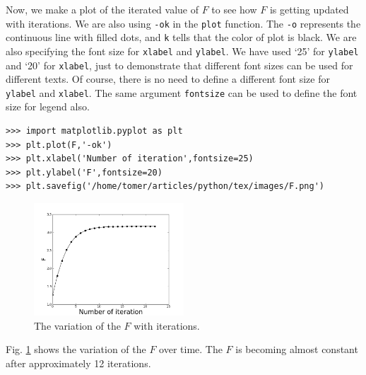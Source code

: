 \documentclass[10pt]{book}
\begin{document}
{Now, we make a plot of the iterated value of $F$ to see how $F$ is getting updated with iterations. We are also using \verb"-ok" in the \verb"plot" function. The \verb"-o" represents the continuous line with filled dots, and \verb"k" tells that the color of plot is black. We are also specifying the font size for \verb"xlabel" and \verb"ylabel". We have used `25' for \verb"ylabel" and `20' for \verb"xlabel", just to demonstrate that different font sizes can be used for different texts. Of course, there is no need to define a different font size for \verb"ylabel" and \verb"xlabel". The same argument \verb"fontsize" can be used to define the font size for legend also. 

\beforeverb \begin{verbatim}
>>> import matplotlib.pyplot as plt
>>> plt.plot(F,'-ok')
>>> plt.xlabel('Number of iteration',fontsize=25)
>>> plt.ylabel('F',fontsize=20)
>>> plt.savefig('/home/tomer/articles/python/tex/images/F.png')
\end{verbatim} \afterverb

\beforefig
\begin{figure}[h!]
  \centering
    \includegraphics[width=0.5\textwidth]{images/F.png}
  \caption{The variation of the $F$ with iterations.}
   \label{fig:F}
\end{figure}
\afterfig

Fig. \ref{fig:F} shows the variation of the $F$ over time. The $F$ is becoming almost constant after approximately 12 iterations. 

}
\end{document}
